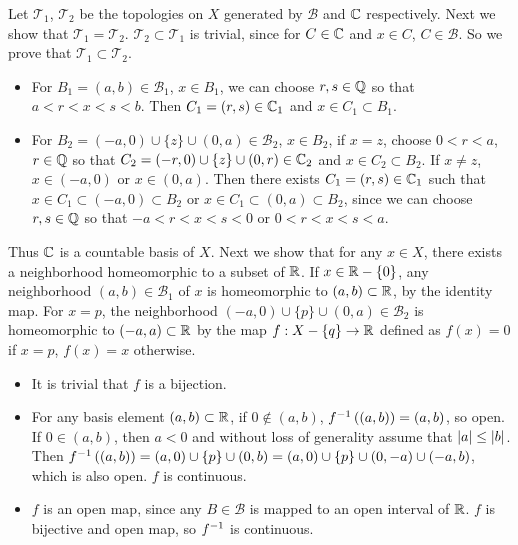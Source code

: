 \documentclass[a4paper,11pt]{article}
\newcommand{\B}{\mathcal{B}}
\newcommand{\T}{\mathcal{T}}
\begin{document}
\begin{minipage}[t][270mm]{90mm}
    \phantom{?} Let \(\T_1\), \(\T_2\) be the topologies on \(X\) generated by \(\B\) and \(\mathbb{C}\) respectively. Next we show that \(\T_1 = \T_2\). \(\T_2 \subset \T_1\) is trivial, since for \(C \in \mathbb{C}\) and \(x \in C\), \(C \in \B\). So we prove that \(\T_1 \subset \T_2\).
    \begin{itemize}
        \item For \(B_1 = (a, b) \in \B_1\), \(x \in B_1\), we can choose \(r, s \in \mathbb{Q}\) so that \(a < r < x < s < b\). Then \(C_1 = (r, s) \in \mathbb{C}_1\) and \(x \in C_1 \subset B_1\).

        \item For \(B_2 = (-a, 0) \cup \{z\} \cup (0, a) \in \B_2\), \(x \in B_2\), if \(x = z\), choose \(0 < r < a\), \(r \in \mathbb{Q}\) so that \(C_2 = (-r, 0) \cup \{z\} \cup (0, r) \in \mathbb{C}_2\) and \(x \in C_2 \subset B_2\). If \(x \neq z\), \(x \in (-a, 0)\) or \(x \in (0, a)\). Then there exists \(C_1 = (r, s) \in \mathbb{C}_1\) such that \(x \in C_1 \subset (-a, 0) \subset B_2\) or \(x \in C_1 \subset (0, a) \subset B_2\), since we can choose \(r, s \in \mathbb{Q}\) so that \(-a < r < x < s < 0\) or \(0 < r < x < s < a\).
    \end{itemize}

    Thus \(\mathbb{C}\) is a countable basis of \(X\). Next we show that for any \(x \in X\), there exists a neighborhood homeomorphic to a subset of \(\mathbb{R}\). If \(x \in \mathbb{R} - \{0\}\), any neighborhood \((a, b) \in \B_1\) of \(x\) is homeomorphic to \((a, b) \subset \mathbb{R}\), by the identity map. For \(x = p\), the neighborhood \((-a, 0) \cup \{p\} \cup (0, a) \in \B_2\) is homeomorphic to \((-a, a) \subset \mathbb{R}\) by the map \(f : X - \{q\} \rightarrow \mathbb{R}\) defined as \(f(x) = 0\) if \(x = p\), \(f(x) = x\) otherwise.
    \begin{itemize}
        \item It is trivial that \(f\) is a bijection.
        \item For any basis element \((a, b) \subset \mathbb{R}\), if \(0 \notin (a, b)\), \(f^{-1}\left( (a, b) \right) = (a, b)\), so open. If \(0 \in (a, b)\), then \(a < 0\) and without loss of generality assume that \(\left| a \right| \leq \left| b \right|\). Then \(f^{-1}\left( (a, b) \right) = (a, 0) \cup \{p\} \cup (0, b) = (a, 0) \cup \{p\} \cup (0, -a) \cup (-a, b)\), which is also open. \(f\) is continuous.
        \item \(f\) is an open map, since any \(B \in \B\) is mapped to an open interval of \(\mathbb{R}\). \(f\) is bijective and open map, so \(f^{-1}\) is continuous.
    \end{itemize}


\end{minipage}
\end{document}
